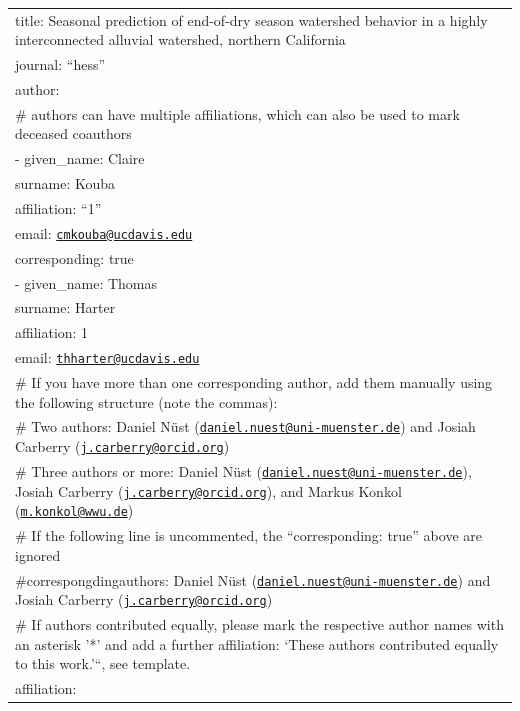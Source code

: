 \documentclass[
]{article}
\author{}
\date{\vspace{-2.5em}}
\begin{document}
\begin{longtable}[]{@{}l@{}}
\toprule()
\endhead
title: Seasonal prediction of end-of-dry season watershed behavior in a
highly interconnected alluvial watershed, northern California \\
journal: ``hess'' \\
author: \\
\# authors can have multiple affiliations, which can also be used to
mark deceased coauthors \\
- given\_name: Claire \\
surname: Kouba \\
affiliation: ``1'' \\
email:
\href{mailto:cmkouba@ucdavis.edu}{\nolinkurl{cmkouba@ucdavis.edu}} \\
corresponding: true \\
- given\_name: Thomas \\
surname: Harter \\
affiliation: 1 \\
email:
\href{mailto:thharter@ucdavis.edu}{\nolinkurl{thharter@ucdavis.edu}} \\
\# If you have more than one corresponding author, add them manually
using the following structure (note the commas): \\
\# Two authors: Daniel Nüst
(\href{mailto:daniel.nuest@uni-muenster.de}{\nolinkurl{daniel.nuest@uni-muenster.de}})
and Josiah Carberry
(\href{mailto:j.carberry@orcid.org}{\nolinkurl{j.carberry@orcid.org}}) \\
\# Three authors or more: Daniel Nüst
(\href{mailto:daniel.nuest@uni-muenster.de}{\nolinkurl{daniel.nuest@uni-muenster.de}}),
Josiah Carberry
(\href{mailto:j.carberry@orcid.org}{\nolinkurl{j.carberry@orcid.org}}),
and Markus Konkol
(\href{mailto:m.konkol@wwu.de}{\nolinkurl{m.konkol@wwu.de}}) \\
\# If the following line is uncommented, the ``corresponding: true''
above are ignored \\
\#correspongdingauthors: Daniel Nüst
(\href{mailto:daniel.nuest@uni-muenster.de}{\nolinkurl{daniel.nuest@uni-muenster.de}})
and Josiah Carberry
(\href{mailto:j.carberry@orcid.org}{\nolinkurl{j.carberry@orcid.org}}) \\
\# If authors contributed equally, please mark the respective author
names with an asterisk '*' and add a further affiliation: `These authors
contributed equally to this work.'``, see template. \\
affiliation: \\

\end{longtable}
\end{document}
